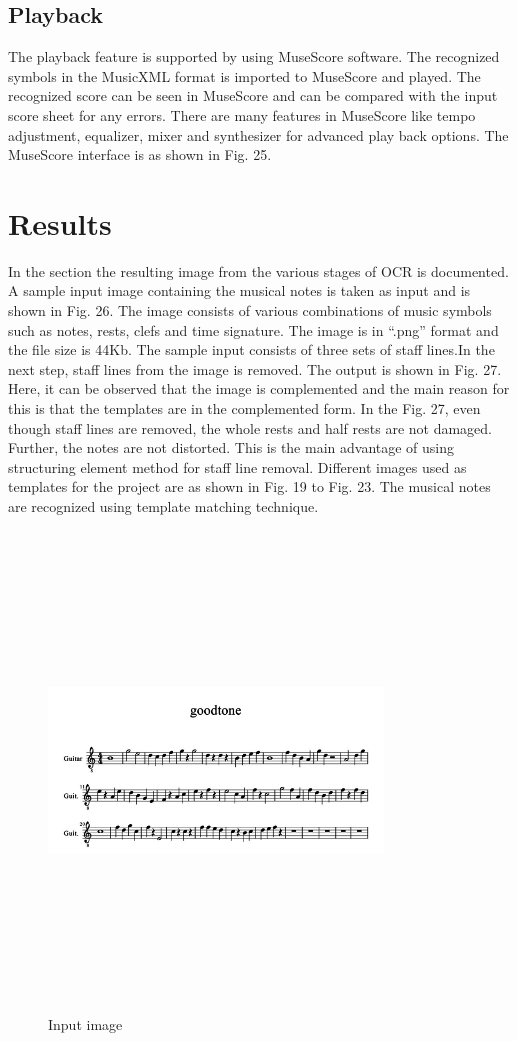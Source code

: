 \documentclass[journal]{IEEEtran}
\begin{document}
\subsection{Playback}
The playback feature is supported by using MuseScore software. The recognized symbols in
the MusicXML format is imported to MuseScore and played. The recognized score can be seen
in MuseScore and can be compared with the input score sheet for any errors. There are many
features in MuseScore like tempo adjustment, equalizer, mixer and synthesizer for advanced play
back options. The MuseScore interface is as shown in Fig. 25.

\section{Results}
In the section the resulting image from the various stages of OCR is documented.  A sample input image containing the musical notes is taken as input and is shown in Fig. 26. The image consists of various combinations of music symbols such as notes, rests, clefs and time signature. The image is in “.png” format and the file size is 44Kb. The sample input consists of three sets of staff lines.In the next step, staff lines from the image is removed. The output is shown in Fig. 27. Here, it can be observed that the image is complemented and the main reason for this is that the templates
are in the complemented form. In the Fig. 27, even though staff lines are removed, the whole rests and half rests are not damaged. Further, the notes are not distorted. This is the main advantage of using structuring element method for staff line removal. Different images used as templates for the project are as shown in Fig. 19 to Fig. 23. The musical notes are recognized using template matching technique. \par
\begin{figure}
\includegraphics[width=3.5in,height=5.0in,clip,keepaspectratio]{resources/results/good_tone}
\centering
\caption{Input image}
\end{figure}
\end{document}
